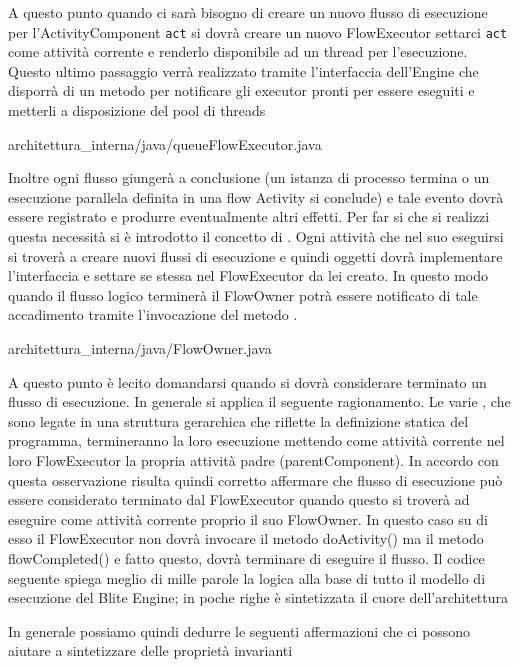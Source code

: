 A questo punto quando ci sarà bisogno di creare un nuovo flusso di esecuzione per
l'ActivityComponent \texttt{act} si dovrà creare un nuovo FlowExecutor settarci
\texttt{act} come attività corrente e renderlo disponibile ad un thread per
l'esecuzione. Questo ultimo passaggio verrà realizzato tramite l'interfaccia
dell'Engine che disporrà di un metodo per notificare gli executor pronti per
essere eseguiti e metterli a disposizione del pool di threads

 {architettura_interna/java/queueFlowExecutor.java}

Inoltre ogni flusso giungerà a conclusione (un istanza di processo termina o un
esecuzione parallela definita in una flow Activity si conclude) e tale evento
dovrà essere registrato e produrre eventualmente altri effetti. Per far si che si
realizzi questa necessità si \`e introdotto il concetto di .
Ogni attività che nel suo eseguirsi si troverà a creare nuovi flussi di
esecuzione e quindi oggetti   dovrà implementare
l'interfaccia  e settare se stessa nel FlowExecutor da lei
creato. In questo modo quando il flusso logico terminerà il FlowOwner potrà
essere notificato di tale accadimento tramite l'invocazione del metodo
.


{architettura_interna/java/FlowOwner.java}

A questo punto \`e lecito domandarsi quando si dovrà considerare terminato un
flusso di esecuzione. In generale si applica il seguente ragionamento. Le varie
, che sono legate in una struttura gerarchica che
riflette la definizione statica del programma, termineranno la loro esecuzione
mettendo come attività corrente nel loro FlowExecutor la propria attività padre
(parentComponent). In accordo con questa osservazione risulta quindi corretto
affermare che flusso di esecuzione può essere considerato terminato dal
FlowExecutor quando questo si troverà ad eseguire come attività corrente proprio
il suo FlowOwner. In questo caso su di esso il FlowExecutor non dovrà invocare il
metodo doActivity() ma il metodo flowCompleted() e fatto questo, dovrà terminare
di eseguire il flusso. Il codice seguente spiega meglio di mille parole la logica
alla base di tutto il modello di esecuzione del Blite Engine; in poche righe \`e
sintetizzata il cuore dell'architettura



In generale possiamo quindi dedurre le seguenti affermazioni che ci possono
aiutare a sintetizzare delle proprietà invarianti

